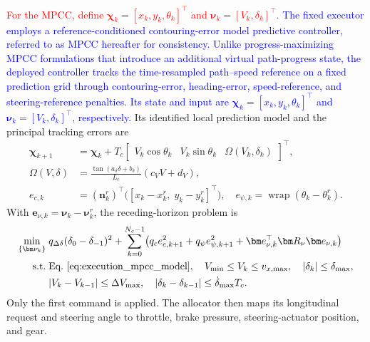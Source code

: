 \textcolor{red}{For the MPCC, define
$\bm\chi_k=[x_k,y_k,\theta_k]^\top$ and
$\bm\nu_k=[V_k,\delta_k]^\top$.}
\textcolor{blue}{The fixed executor employs a reference-conditioned
contouring-error model predictive controller, referred to as MPCC hereafter
for consistency. Unlike progress-maximizing MPCC formulations that introduce
an additional virtual path-progress state, the deployed controller tracks the
time-resampled path--speed reference on a fixed prediction grid through
contouring-error, heading-error, speed-reference, and steering-reference
penalties. Its state and input are
$\bm\chi_k=[x_k,y_k,\theta_k]^\top$ and
$\bm\nu_k=[V_k,\delta_k]^\top$, respectively.}
Its identified local prediction model and the
principal tracking errors are
\begin{equation}
\begin{aligned}
\bm\chi_{k+1}&=\bm\chi_k+T_c
\begin{bmatrix}V_k\cos\theta_k&V_k\sin\theta_k&
\Omega(V_k,\delta_k)\end{bmatrix}^{\!\top},\\
\Omega(V,\delta)&=\frac{\tan(a_\delta\delta+b_\delta)}{L_c}(c_VV+d_V),\\
e_{c,k}&=(\bm n_k^r)^\top
\bigl([x_k-x_k^r,\;y_k-y_k^r]^\top\bigr),\quad
e_{\psi,k}=\operatorname{wrap}(\theta_k-\theta_k^r).
\end{aligned}
\label{eq:execution_mpcc_model}
\end{equation}
With $\bm e_{\nu,k}=\bm\nu_k-\bm\nu_k^r$, the receding-horizon problem is
\begin{equation}
\begin{aligned}
\min_{\{\bm\nu_k\}}\;&q_{\Delta\delta}(\delta_0-\delta_{-1})^2
+\sum_{k=0}^{N_c-1}\!\left(q_ce_{c,k+1}^2+q_\psi e_{\psi,k+1}^2
+\bm e_{\nu,k}^\top\bm R_\nu\bm e_{\nu,k}\right)\\
\mathrm{s.t.}\;&\text{Eq.~\eqref{eq:execution_mpcc_model}},\quad
V_{\min}\le V_k\le v_{x,\max},\quad |\delta_k|\le\delta_{\max},\\
&|V_k-V_{k-1}|\le\Delta V_{\max},\quad
|\delta_k-\delta_{k-1}|\le\dot\delta_{\max}T_c.
\end{aligned}
\label{eq:execution_mpcc}
\end{equation}
Only the first command is applied. The allocator then maps its longitudinal
request and steering angle to throttle, brake pressure, steering-actuator
position, and gear.

